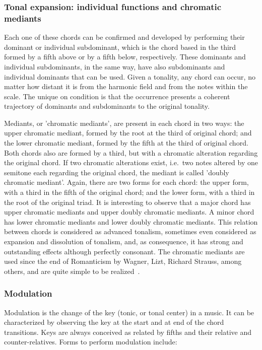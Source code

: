 \documentclass[
 aip,
 jmp,
 amsmath,amssymb,
 reprint,
]{revtex4-1}
\begin{document}
\subsubsection{Tonal expansion: individual functions and chromatic mediants}


Each one of these chords can be confirmed and developed by performing their
dominant or individual subdominant, which is the chord based in the third formed
by a fifth above or by a fifth below, respectively. These dominants and individual
subdominants, in the same way, have also subdominants and individual dominants that
can be used. Given a tonality, any chord can occur, no matter
how distant it is from the harmonic field and from the notes within the
scale. The unique on condition is that the occurrence presents a coherent trajectory of
dominants and subdominants to the original tonality.

Mediants, or 'chromatic mediants', are present in each chord in two ways: the upper chromatic
mediant, formed by the root at the third of original chord; and the lower
chromatic mediant, formed by the fifth at the third of original chord. Both chords also are formed by a third, but with a chromatic alteration regarding
the original chord. If two chromatic alterations exist, i.e.\ two notes altered
by one semitone each regarding the original chord, the mediant is called
'doubly chromatic mediant'. Again, there are two forms for each chord: the upper form, with
a third in the fifth of the original chord; and the lower form, with a third in the root
of the original triad. It is interesting to observe that a major chord has upper chromatic mediants and upper doubly chromatic mediants. A minor chord has lower chromatic mediants and lower doubly chromatic mediants. This relation between chords is considered as
advanced tonalism, sometimes even considered as expansion and dissolution of tonalism, and, as consequence, it has strong and outstanding effects although perfectly consonant. The chromatic
mediants are used since the end of Romanticism by Wagner, Lizt, Richard Strauss,
among others, and are quite simple to be realized~\cite{Harmonia,Salzer}. 


\subsubsection{Modulation}

Modulation is the change of the key (tonic, or tonal center) in a music. It can be characterized by observing the key at the start and at end of the chord transitions. Keys are always conceived as related by fifths and their relative and counter-relatives. Forms to perform modulation include:
\end{document}
